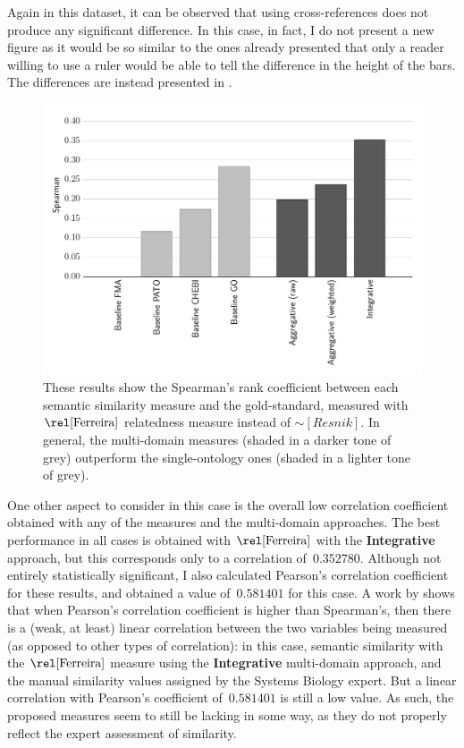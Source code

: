 Again in this dataset, it can be observed that using cross-references does not produce any significant difference. In this case, in fact, I do not present a new figure as it would be so similar to the ones already presented that only a reader willing to use a ruler would be able to tell the difference in the height of the bars. The differences are instead presented in .

\thisfloatontop
\begin{figure}
    \centering
    \includegraphics[width=0.9\linewidth]{images/biomodels-ferreira.pdf}
    \caption[Semantic similarity in the Biochemical Models dataset with~\boldmath$\ferreira$]{These results show the Spearman's rank coefficient between each semantic similarity measure and the gold-standard, measured with $\ferreira$ relatedness measure instead of $\sim[Resnik]$. In general, the multi-domain measures (shaded in a darker tone of grey) outperform the single-ontology ones (shaded in a lighter tone of grey).}
    \label{fig:biomodels-ferreira}
\end{figure}

One other aspect to consider in this case is the overall low correlation coefficient obtained with any of the measures and the multi-domain approaches. The best performance in all cases is obtained with $\ferreira$ with the \textbf{Integrative} approach, but this corresponds only to a correlation of~$0.352780$. Although not entirely statistically significant, I also calculated Pearson's correlation coefficient for these results, and obtained a value of~$0.581401$ for this case. A work by \citet{Hauke2011} shows that when Pearson's correlation coefficient is higher than Spearman's, then there is a (weak, at least) linear correlation between the two variables being measured (as opposed to other types of correlation): in this case, semantic similarity with the $\ferreira$ measure using the \textbf{Integrative} multi-domain approach, and the manual similarity values assigned by the Systems Biology expert. But a linear correlation with Pearson's coefficient of~$0.581401$ is still a low value. As such, the proposed measures seem to still be lacking in some way, as they do not properly reflect the expert assessment of similarity.

